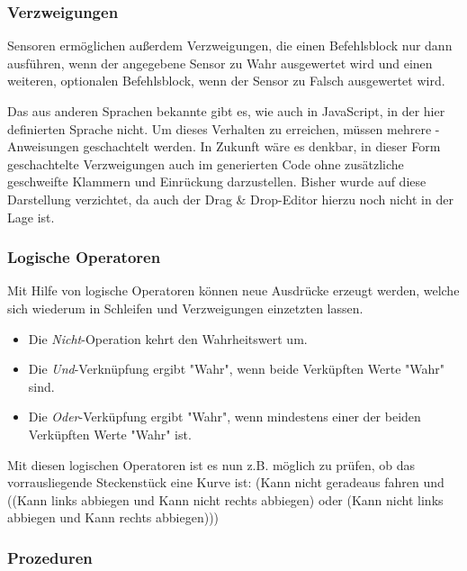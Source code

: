 \subsubsection{Verzweigungen}
\label{sec:implementation:program:elements:if-else}

Sensoren ermöglichen außerdem Verzweigungen, die einen Befehlsblock nur dann ausführen, wenn der angegebene Sensor zu Wahr ausgewertet wird und einen weiteren, optionalen Befehlsblock, wenn der Sensor zu Falsch ausgewertet wird.

Das aus anderen Sprachen bekannte  gibt es, wie auch in JavaScript, in der hier definierten Sprache nicht. Um dieses Verhalten zu erreichen, müssen mehrere -Anweisungen geschachtelt werden. In Zukunft wäre es denkbar, in dieser Form geschachtelte Verzweigungen auch im generierten Code ohne zusätzliche geschweifte Klammern und Einrückung darzustellen. Bisher wurde auf diese Darstellung verzichtet, da auch der Drag \& Drop-Editor hierzu noch nicht in der Lage ist.

\subsubsection{Logische Operatoren}
\label{sec:implementation:program:elements:op}

Mit Hilfe von logische Operatoren können neue Ausdrücke erzeugt werden, welche sich wiederum in Schleifen und Verzweigungen einzetzten lassen.

\begin{itemize}
  \item Die \emph{Nicht}-Operation kehrt den Wahrheitswert um.
  \item Die \emph{Und}-Verknüpfung ergibt "Wahr", wenn beide Verküpften Werte "Wahr" sind.
  \item Die \emph{Oder}-Verküpfung ergibt "Wahr", wenn mindestens einer der beiden Verküpften Werte "Wahr" ist.
\end{itemize}

Mit diesen logischen Operatoren ist es nun z.B. möglich zu prüfen, ob das vorrausliegende Steckenstück eine Kurve ist: (Kann nicht geradeaus fahren und ((Kann links abbiegen und Kann nicht rechts abbiegen) oder (Kann nicht links abbiegen und Kann rechts abbiegen)))

\subsubsection{Prozeduren}
\label{sec:implementation:program:elements:proc}

